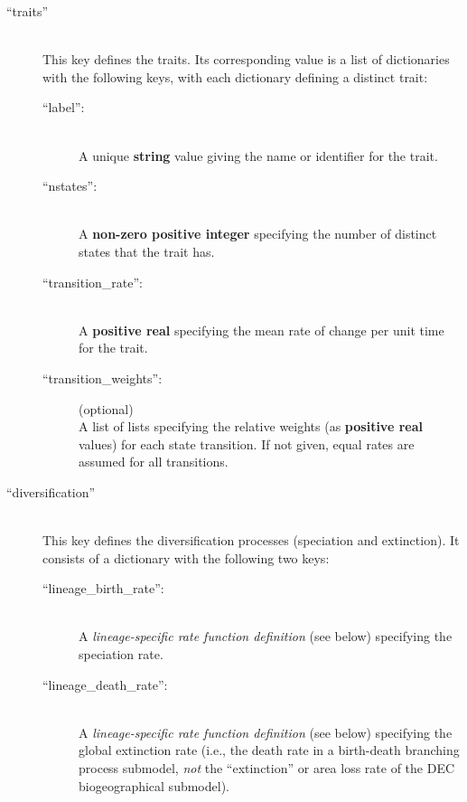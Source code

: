 \documentclass[11pt,openany]{memoir} %
\begin{document}
\begin{description}
    \item[``traits'']  \hfill \\
        This key defines the traits.
        Its corresponding value is a list of dictionaries with the following keys, with each dictionary defining a distinct trait:
        \begin{description}
            \item[``label'':] \hfill \\
                A unique \textbf{string} value giving the name or identifier for the trait.
            \item[``nstates'':] \hfill \\
                A \textbf{non-zero positive integer} specifying the number of distinct states that the trait has.
            \item[``transition\_rate'':] \hfill \\
                A \textbf{positive real} specifying the mean rate of change per unit time for the trait.
            \item[``transition\_weights'':] (optional) \hfill \\
                A list of lists specifying the relative weights (as \textbf{positive real} values) for each state transition. If not given, equal rates are assumed for all transitions.
        \end{description}

    \item[``diversification'']  \hfill \\
        This key defines the diversification processes (speciation and extinction).
        It consists of a dictionary with the following two keys:
        \begin{description}
            \item[``lineage\_birth\_rate'':] \hfill \\
                A \textit{lineage-specific rate function definition} (see below) specifying the speciation rate.
            \item[``lineage\_death\_rate'':] \hfill \\
                A \textit{lineage-specific rate function definition} (see below) specifying the global extinction rate (i.e., the death rate in a birth-death branching process submodel, \textit{not} the ``extinction'' or area loss rate of the DEC biogeographical submodel).
        \end{description}


\end{description}
\end{document}
